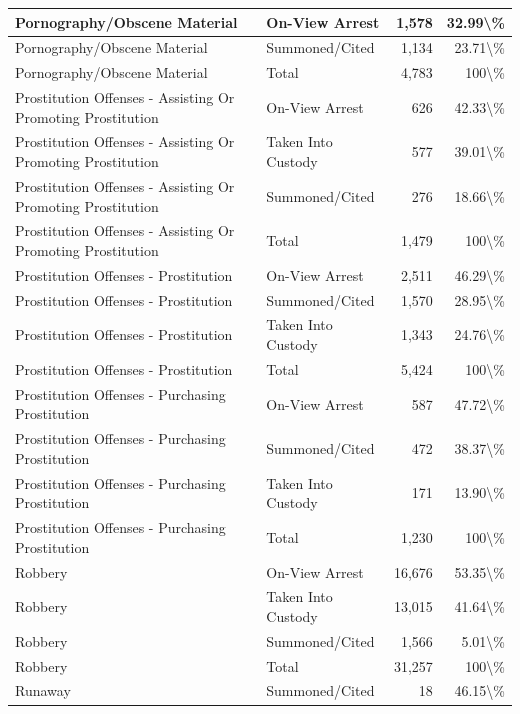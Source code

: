 \documentclass[
]{krantz}
\begin{document}
\begin{longtable}[t]{l|l|r|r}
\hline
Pornography/Obscene Material & On-View Arrest & 1,578 & 32.99\textbackslash{}\%\\
\hline
Pornography/Obscene Material & Summoned/Cited & 1,134 & 23.71\textbackslash{}\%\\
\hline
Pornography/Obscene Material & Total & 4,783 & 100\textbackslash{}\%\\
\hline
Prostitution Offenses - Assisting Or Promoting Prostitution & On-View Arrest & 626 & 42.33\textbackslash{}\%\\
\hline
Prostitution Offenses - Assisting Or Promoting Prostitution & Taken Into Custody & 577 & 39.01\textbackslash{}\%\\
\hline
Prostitution Offenses - Assisting Or Promoting Prostitution & Summoned/Cited & 276 & 18.66\textbackslash{}\%\\
\hline
Prostitution Offenses - Assisting Or Promoting Prostitution & Total & 1,479 & 100\textbackslash{}\%\\
\hline
Prostitution Offenses - Prostitution & On-View Arrest & 2,511 & 46.29\textbackslash{}\%\\
\hline
Prostitution Offenses - Prostitution & Summoned/Cited & 1,570 & 28.95\textbackslash{}\%\\
\hline
Prostitution Offenses - Prostitution & Taken Into Custody & 1,343 & 24.76\textbackslash{}\%\\
\hline
Prostitution Offenses - Prostitution & Total & 5,424 & 100\textbackslash{}\%\\
\hline
Prostitution Offenses - Purchasing Prostitution & On-View Arrest & 587 & 47.72\textbackslash{}\%\\
\hline
Prostitution Offenses - Purchasing Prostitution & Summoned/Cited & 472 & 38.37\textbackslash{}\%\\
\hline
Prostitution Offenses - Purchasing Prostitution & Taken Into Custody & 171 & 13.90\textbackslash{}\%\\
\hline
Prostitution Offenses - Purchasing Prostitution & Total & 1,230 & 100\textbackslash{}\%\\
\hline
Robbery & On-View Arrest & 16,676 & 53.35\textbackslash{}\%\\
\hline
Robbery & Taken Into Custody & 13,015 & 41.64\textbackslash{}\%\\
\hline
Robbery & Summoned/Cited & 1,566 & 5.01\textbackslash{}\%\\
\hline
Robbery & Total & 31,257 & 100\textbackslash{}\%\\
\hline
Runaway & Summoned/Cited & 18 & 46.15\textbackslash{}\%\\

\end{longtable}
\end{document}
